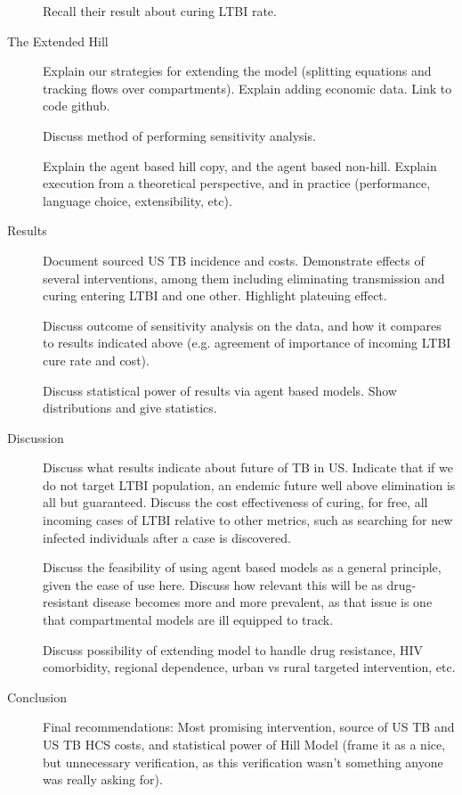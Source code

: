 \documentclass{amsart}
\begin{document}
\begin{description}
    Recall their result about curing LTBI rate. 
  \item[The Extended Hill]
    Explain our strategies for extending the model (splitting equations and
    tracking flows over compartments). Explain adding economic data. Link to
    code github. 

    Discuss method of performing sensitivity analysis.

    Explain the agent based hill copy, and the agent based non-hill. Explain
    execution from a theoretical perspective, and in practice (performance,
    language choice, extensibility, etc). 
  \item[Results]
    Document sourced US TB incidence and costs. Demonstrate effects of several
    interventions, among them including eliminating transmission and curing
    entering LTBI and one other. Highlight plateuing effect. 

    Discuss outcome of sensitivity analysis on the data, and how it compares to
    results indicated above (e.g. agreement of importance of incoming LTBI cure
    rate and cost). 

    Discuss statistical power of results via agent based models. Show
    distributions and give statistics. 
  \item[Discussion]
    Discuss what results indicate about future of TB in US. Indicate that if we
    do not target LTBI population, an endemic future well above elimination is
    all but guaranteed. Discuss the cost effectiveness of curing, for free, all
    incoming cases of LTBI relative to other metrics, such as searching for new
    infected individuals after a case is discovered. 

    Discuss the feasibility of using agent based models as a general principle,
    given the ease of use here. Discuss how relevant this will be as
    drug-resistant disease becomes more and more prevalent, as that issue is one
    that compartmental models are ill equipped to track. 

    Discuss possibility of extending model to handle drug resistance, HIV
    comorbidity, regional dependence, urban vs rural targeted intervention, etc. 
  \item[Conclusion]
    Final recommendations: Most promising intervention, source of US TB and US
    TB HCS costs, and statistical power of Hill Model (frame it as a nice, but
    unnecessary verification, as this verification wasn't something anyone was
    really asking for). 
\end{description}
\end{document}
